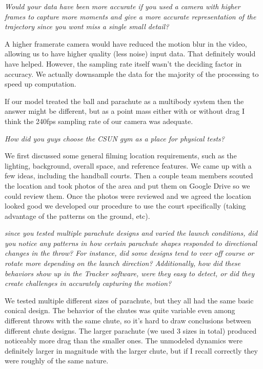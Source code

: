 \medskip 

\textit{Would your data have been more accurate if you used a camera with higher frames to capture more moments and give a more accurate representation of the trajectory since you wont miss a single small detail?}

\smallskip

A higher framerate camera would have reduced the motion blur in the video, allowing us to have higher quality (less noise) input data. That definitely would have helped. However, the sampling rate itself wasn't the deciding factor in accuracy. We actually downsample the data for the majority of the processing to speed up computation. 

If our model treated the ball and parachute as a multibody system then the answer might be different, but as a point mass either with or without drag I think the 240fps sampling rate of our camera was adequate. 

\medskip 

\textit{How did you guys choose the CSUN gym as a place for physical tests?}

\smallskip

We first discussed some general filming location requirements, such as the lighting, background, overall space, and reference features. We came up with a few ideas, including the handball courts. Then a couple team members scouted the location and took photos of the area and put them on Google Drive so we could review them. Once the photos were reviewed and we agreed the location looked good we developed our procedure to use the court specifically (taking advantage of the patterns on the ground, etc). 

\medskip 

\textit{since you tested multiple parachute designs and varied the launch conditions, did you notice any patterns in how certain parachute shapes responded to directional changes in the throw? For instance, did some designs tend to veer off course or rotate more depending on the launch direction? Additionally, how did these behaviors show up in the Tracker software, were they easy to detect, or did they create challenges in accurately capturing the motion?}

\smallskip

We tested multiple different sizes of parachute, but they all had the same basic conical design. The behavior of the chutes was quite variable even among different throws with the same chute, so it's hard to draw conclusions between different chute designs. The larger parachute (we used 3 sizes in total) produced noticeably more drag than the smaller ones. The unmodeled dynamics were definitely larger in magnitude with the larger chute, but if I recall correctly they were roughly of the same nature.  

